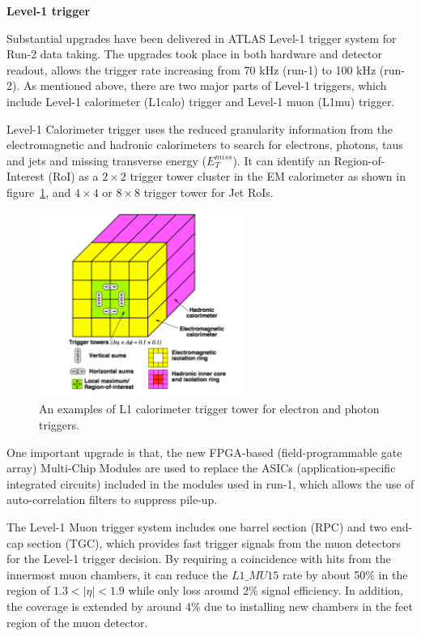 \textbf{Level-1 trigger}

Substantial upgrades have been delivered in ATLAS Level-1 trigger system for Run-2 data taking.
The upgrades took place in both hardware and detector readout, allows the trigger rate increasing from 70 kHz (run-1) to 100 kHz (run-2).
As mentioned above, there are two major parts of Level-1 triggers, which include Level-1 calorimeter (L1calo) trigger and Level-1 muon (L1mu) trigger.

Level-1 Calorimeter trigger uses the reduced granularity information from the electromagnetic and hadronic calorimeters to search for electrons, photons, taus and jets and missing transverse energy ($E_{T}^{miss}$).
It can identify an Region-of-Interest (RoI) as a $2 \times 2$ trigger tower cluster in the EM calorimeter as shown in figure~\ref{fig:trig_tower}, 
and $4 \times 4$ or $8 \times 8$ trigger tower for Jet RoIs.
\begin{figure}[!htb]
  \centering
  \includegraphics[width=0.6\textwidth]{figures/Detector/trig_tower.png}
  \caption{An examples of L1 calorimeter trigger tower for electron and photon triggers\cite{Pasztor:2063746}.}
  \label{fig:trig_tower}
\end{figure}
One important upgrade is that, the new FPGA-based (field-programmable gate array) Multi-Chip Modules are used to replace the ASICs (application-specific integrated circuits) included in the modules used in run-1,
which allows the use of auto-correlation filters to suppress pile-up.

The Level-1 Muon trigger system includes one barrel section (RPC) and two end-cap section (TGC), which provides fast trigger signals from the muon detectors for the Level-1 trigger decision.
By requiring a coincidence with hits from the innermost muon chambers, it can reduce the $L1\_MU15$ rate by about 50\% in the region of $1.3 < |\eta| < 1.9$ while only loss around 2\% signal efficiency.
In addition, the coverage is extended by around 4\% due to installing new chambers in the feet region of the muon detector.

